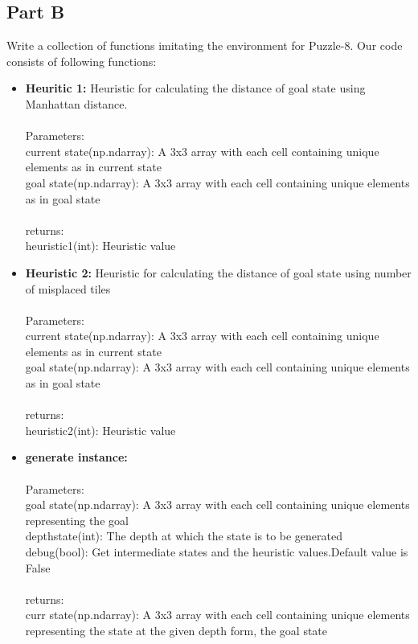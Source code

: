 \documentclass[conference]{IEEEtran}
\begin{document}
\subsection{Part B}
Write a collection of functions imitating the environment
for Puzzle-8. Our code consists of following functions:
\begin{itemize}
    \item \textbf{Heuritic 1:} 
Heuristic for calculating the distance of goal state
using Manhattan distance.\cite{b6}
\\
\\
Parameters:
\\
current state(np.ndarray): A 3x3 array with each
cell containing unique elements as in current state
\\
goal state(np.ndarray): A 3x3 array with each
cell containing unique elements as in goal state
\\
\\
returns:
\\
heuristic1(int): Heuristic value
\\
    \item \textbf{Heuristic 2:}
Heuristic for calculating the distance of goal state
using number of misplaced tiles
\\
\\
Parameters:
\\
current state(np.ndarray): A 3x3 array with each
cell containing unique elements as in current state
\\
goal state(np.ndarray): A 3x3 array with each
cell containing unique elements as in goal state
\\
\\
returns:
\\
heuristic2(int): Heuristic value
\\
   \item \textbf{generate instance:}
\\  
\\
Parameters:
\\
goal state(np.ndarray): A 3x3 array with each cell containing unique elements representing the goal
\\
depthstate(int): The depth at which the state is to be
generated
\\
debug(bool): Get intermediate states and the heuristic
values.Default value is False
\\
\\
returns:
\\
curr state(np.ndarray): A 3x3 array with each cell containing unique elements representing the state at the given depth form, the goal state   

\end{itemize}
\end{document}
